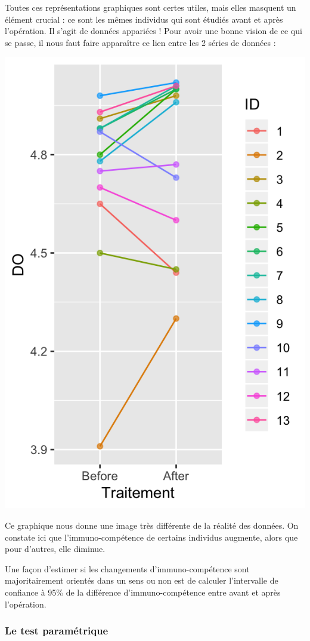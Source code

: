\documentclass[a4paperpaper,]{article}
\newenvironment{Shaded}{\begin{snugshade}}{\end{snugshade}}
\newcommand{\DataTypeTok}[1]{\textcolor[rgb]{0.00,0.34,0.68}{#1}}
\newcommand{\FloatTok}[1]{\textcolor[rgb]{0.69,0.50,0.00}{#1}}
\newcommand{\KeywordTok}[1]{\textcolor[rgb]{0.12,0.11,0.11}{\textbf{#1}}}
\newcommand{\NormalTok}[1]{\textcolor[rgb]{0.12,0.11,0.11}{#1}}
\newcommand{\OperatorTok}[1]{\textcolor[rgb]{0.12,0.11,0.11}{#1}}
\newcommand{\StringTok}[1]{\textcolor[rgb]{0.75,0.01,0.01}{#1}}
\begin{document}
Toutes ces représentations graphiques sont certes utiles, mais elles masquent un élément crucial : ce sont les mêmes individus qui sont étudiés avant et après l'opération. Il s'agit de données appariées ! Pour avoir une bonne vision de ce qui se passe, il nous faut faire apparaître ce lien entre les 2 séries de données :

\begin{Shaded}
\end{Shaded}

\begin{center}\includegraphics[width=0.33\linewidth]{figure/unnamed-chunk-36-1} \end{center}

Ce graphique nous donne une image très différente de la réalité des données. On constate ici que l'immuno-compétence de certains individus augmente, alors que pour d'autres, elle diminue.

Une façon d'estimer si les changements d'immuno-compétence sont majoritairement orientés dans un sens ou non est de calculer l'intervalle de confiance à 95\% de la différence d'immuno-compétence entre avant et après l'opération.

\hypertarget{le-test-paramuxe9trique-1}{%
\subsubsection{Le test paramétrique}\label{le-test-paramuxe9trique-1}}
\end{document}
